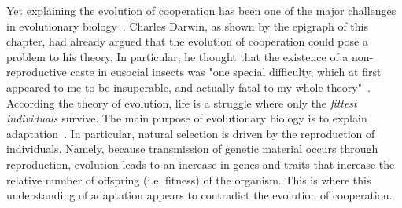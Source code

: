     Yet explaining the evolution of cooperation has been one of the major challenges in evolutionary biology~\parencite{Hamilton1964, Dugatkin2002, West2011a}. Charles Darwin, as shown by the epigraph of this chapter, had already argued that the evolution of cooperation could pose a problem to his theory. In particular, he thought that the existence of a non-reproductive caste in eusocial insects was "one special difficulty, which at first appeared to me to be insuperable, and actually fatal to my whole theory"~\parencite{Darwin1859}. According the theory of evolution, life is a struggle where only the \emph{fittest individuals} survive. The main purpose of evolutionary biology is to explain adaptation~\parencite{West2011a}. In particular, natural selection is driven by the reproduction of individuals. Namely, because transmission of genetic material occurs through reproduction, evolution leads to an increase in genes and traits that increase the relative number of offspring (i.e. fitness) of the organism. This is where this understanding of adaptation appears to contradict the evolution of cooperation.




